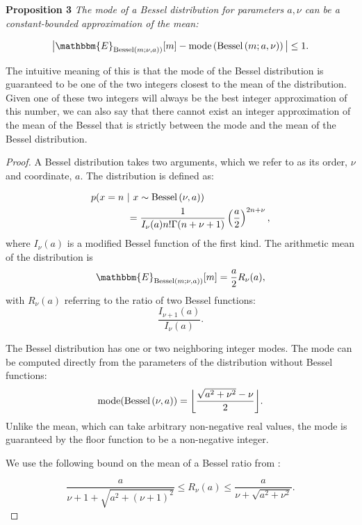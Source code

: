 \documentclass[letterpaper]{article}
\newcommand{\Bess}[1]{\textup{Bessel}\left( #1 \right)}
\newcommand{\besv}{order}
\newcommand{\besa}{coordinate}
\begin{document}
  \textbf{Proposition 3}
    \label{theorem:besselmode}
    \textit{The mode of a Bessel distribution for parameters $a, \nu$ can be a constant-bounded approximation of the mean:}
  
  \[
      \big| \mathbbm{E}_{\Bess{m; \nu, a})}[m]  - \textup{mode} \left(\Bess{m; a, \nu} \right) \big|  \leq 1.  
  \]
  
  The intuitive meaning of this is that the mode of the Bessel distribution is
  guaranteed to be one of the two integers closest to the mean of the
  distribution. Given one of these two integers will always be the best integer
  approximation of this number, we can also say that there cannot exist an
  integer approximation of the mean of the Bessel that is strictly between the
  mode and the mean of the Bessel distribution.
  
  \begin{proof}
  
  A Bessel distribution takes two arguments, which we refer to as its \besv,
  $\nu$ and \besa, $a$. The distribution is defined as:
  
  \begin{align}
      p(x = n~&|~x \sim \Bess{\nu, a})\notag \\
      &= \frac{1}{I_{\nu}(a)n!\Gamma(n + \nu + 1)} \left( \frac{a}{2} \right)^{2n + \nu},   
  \end{align}
  where $I_{\nu}(a)$ is a modified Bessel function of the first kind. The
  arithmetic mean of the distribution is
  \[
      \mathbbm{E}_{\Bess{m; \nu, a})}[m] = \frac{a}{2} R_{\nu}(a),
  \]
  with $R_{\nu}(a)$ referring to the ratio of two Bessel functions:
  \[
      \frac{I_{\nu + 1}(a)}{I_{\nu}(a)}.
  \]
  
  The Bessel distribution has one or two neighboring integer modes. The mode can
  be computed directly from the parameters of the distribution without Bessel
  functions:
  \[
      \textup{mode}(\Bess{\nu, a}) = \bigg \lfloor \frac{\sqrt{a^2 + \nu^2} - \nu}{2} \bigg \rfloor.
  \]
  Unlike the mean, which can take arbitrary non-negative real values, the mode
  is guaranteed by the floor function to be a non-negative integer.
  
  We use the following bound on the mean of a Bessel ratio from
  \citet{devroye2002simulating}:
  
  \begin{equation}
      \frac{a}{\nu + 1 + \sqrt{a^2 + (\nu + 1)^2}} \leq R_{\nu}(a)
      \leq \frac{a}{\nu + \sqrt{a^2 + \nu^2}}.
  \end{equation}
  

\end{proof}
\end{document}
